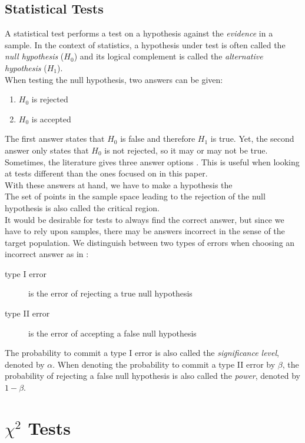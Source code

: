 \documentclass{article}
\begin{document}
\subsection{Statistical Tests}
A statistical test performs a test on a hypothesis against the \emph{evidence} in a sample.
In the context of statistics, a hypothesis under test is often called the \emph{null hypothesis} ($H_0$) and its logical complement is called the \emph{alternative hypothesis} ($H_1$).
\\
When testing the null hypothesis, two answers can be given:
\begin{enumerate}
	\item $H_0$ is rejected
	\item $H_0$ is accepted
\end{enumerate}
The first answer states that $H_0$ is false and therefore $H_1$ is true.
Yet, the second answer only states that $H_0$ is not rejected, so it may or may not be true.
Sometimes, the literature gives three answer options \cite{weigand2009statistik}.
This is useful when looking at tests different than the ones focused on in this paper.
\\
With these answers at hand, we have to make a hypothesis the 
\\
The set of points in the sample space leading to the rejection of the null hypothesis is also called the critical region.
\\
It would be desirable for tests to always find the correct answer, but since we have to rely upon samples, there may be answers incorrect in the sense of the target population.
We distinguish between two types of errors when choosing an incorrect answer as in \cite{conover1980practical}:
\begin{description}
	\item[type I error] is the error of rejecting a true null hypothesis
	\item[type II error] is the error of accepting a false null hypothesis
\end{description}
The probability to commit a type I error is also called the \emph{significance level}, denoted by $\alpha$.
When denoting the probability to commit a type II error by $\beta$, the probability of rejecting a false null hypothesis is also called the \emph{power}, denoted by $1-\beta$.



\section{$\chi^2$ Tests}
\end{document}
